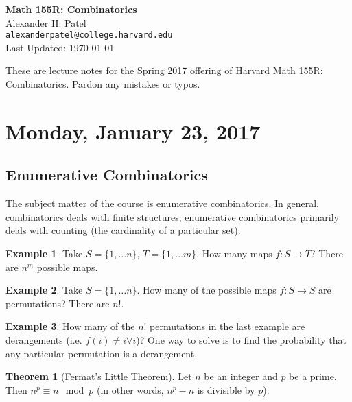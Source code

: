 \documentclass[12pt]{article}
\theoremstyle{definition}
\newtheorem{theorem}{Theorem}
\newtheorem{exmp}{Example}[section]
\begin{document}
\begin{center}
\textbf{Math 155R: Combinatorics} \\
Alexander H. Patel \\
{\tt alexanderpatel@college.harvard.edu} \\
Last Updated: \today
\end{center}

These are lecture notes for the Spring 2017 offering of Harvard Math 155R:
Combinatorics. Pardon any mistakes or typos.

\tableofcontents

\section{Monday, January 23, 2017}

\subsection{Enumerative Combinatorics}

The subject matter of the course is enumerative combinatorics. In general,
combinatorics deals with finite structures; enumerative combinatorics primarily
deals with counting (the cardinality of a particular set).

\begin{exmp}
    Take $S = \{1, \ldots n\}$, $T = \{1, \ldots m\}$. How many maps $f: S
    \rightarrow T$? There are $n^m$ possible maps.
\end{exmp}

\begin{exmp}
    Take $S = \{1, \ldots n\}$. How many of the possible maps $f: S
    \rightarrow S$ are permutations? There are $n!$.
\end{exmp}

\begin{exmp}
    How many of the $n!$ permutations in the last example are
    derangements (i.e. $f(i) \ne i \forall i$)? One way to solve is to
    find the probability that any particular permutation is a
    derangement. 
\end{exmp}

\begin{theorem}[Fermat's Little Theorem]
    Let $n$ be an integer and $p$ be a prime. Then $n^p \equiv n \mod
    p$ (in other words, $n^p - n$ is divisible by $p$).
\end{theorem}
\end{document}
